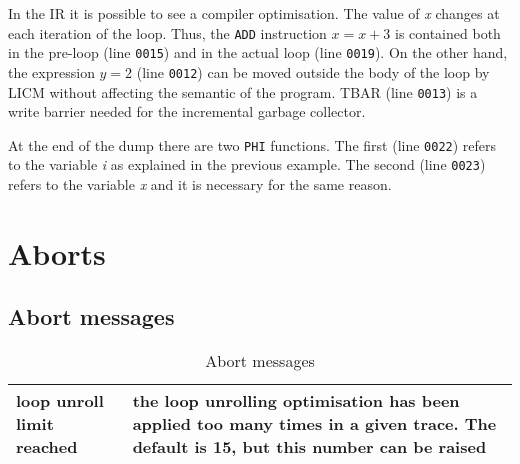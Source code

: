 In the IR it is possible to see a compiler optimisation. The value of \textit{x} changes at each iteration of the loop. Thus, the \texttt{ADD} instruction $x=x+3$ is contained both in the pre-loop (line \texttt{0015}) and in the actual loop (line \texttt{0019}). On the other hand, the expression $y=2$ (line \texttt{0012}) can be moved outside the body of the loop by LICM without affecting the semantic of the program. TBAR (line \texttt{0013}) is a write barrier needed for the incremental garbage collector.

At the end of the dump there are two \texttt{PHI} functions. The first (line \texttt{0022}) refers to the variable \textit{i} as explained in the previous example. The second (line \texttt{0023}) refers to the variable \textit{x} and it is necessary for the same reason.


\section{Aborts}

\subsection{Abort messages}

\begin{table}[H]
\centering
\begin{tabular}{|p{5cm}|p{8cm}|}
\hline
loop unroll limit reached & the loop unrolling  optimisation has been applied too many times in a given trace. The default is 15, but this number can be raised\\
\hline

\end{tabular}
\caption{Abort messages}
\label{tab:abort-messages}
\end{table}

\fi